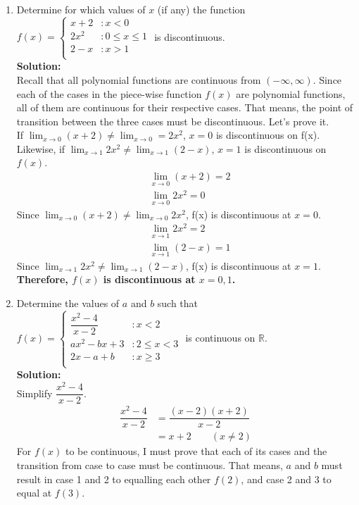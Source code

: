 \documentclass[12pt]{book}
\begin{document}
\begin{enumerate}
\newpage


\item Determine for which values of $x$ (if any) the function $f(x) = \begin{cases} 
      x + 2 & : x < 0 \\
      2x^2 & : 0 \le x \le 1 \\
		 2-x & : x>1 \\
   \end{cases}$ is discontinuous.\\

\textbf{Solution:} \\
Recall that all polynomial functions are continuous from $(-\infty, \infty)$. Since each of the cases in the piece-wise function $f(x)$ are polynomial functions, all of them are continuous for their respective cases. That means, the point of transition between the three cases must be discontinuous. Let's prove it. \\

If $\lim_{x\to 0}\limits (x+2) \neq \lim_{x\to 0}\limits = 2x^2$, $x=0$ is discontinuous on f(x). Likewise, if $\lim_{x\to 1}\limits 2x^2 \neq \lim_{x\to 1}\limits (2-x)$, $x=1$ is discontinuous on $f(x)$.
\setcounter{equation}{0}
\begin{align}
    &\lim_{x\to 0}\limits (x+2) = 2 \\
    &\lim_{x\to 0}\limits 2x^2 = 0
\end{align}
Since $\lim_{x\to 0}\limits (x+2) \neq \lim_{x\to 0}\limits 2x^2$, f(x) is discontinuous at $x=0$.
\begin{align}
    &\lim_{x\to 1}\limits 2x^2 = 2 \\
    &\lim_{x\to 1}\limits (2-x) = 1
\end{align}
Since $\lim_{x\to 1}\limits 2x^2 \neq \lim_{x\to 1}\limits (2-x)$, f(x) is discontinuous at $x=1$.\\

\textbf{Therefore, $f(x)$ is discontinuous at $x=0,1$.}


\newpage


\item Determine the values of $a$ and $b$ such that $f(x) = \begin{cases} 
      \dfrac{x^2-4}{x-2} & : x < 2 \\
      ax^2-bx+3 & : 2 \leq x < 3 \\
		 2x-a+b & : x \ge 3 \\
   \end{cases}$ is continuous on $\mathbb{R}$.\\
\textbf{Solution:\\}
Simplify $\dfrac{x^2-4}{x-2}$.
\setcounter{equation}{0}
\begin{align}
    \dfrac{x^2-4}{x-2} &= \dfrac{(x-2)(x+2)}{x-2} \\
    &= x+2 \qquad (x \neq 2)
\end{align}
For $f(x)$ to be continuous, I must prove that each of its cases and the transition from case to case must be continuous. That means, $a$ and $b$ must result in case 1 and 2 to equalling each other $f(2)$, and case 2 and 3 to equal at $f(3)$. \\


\end{enumerate}
\end{document}
